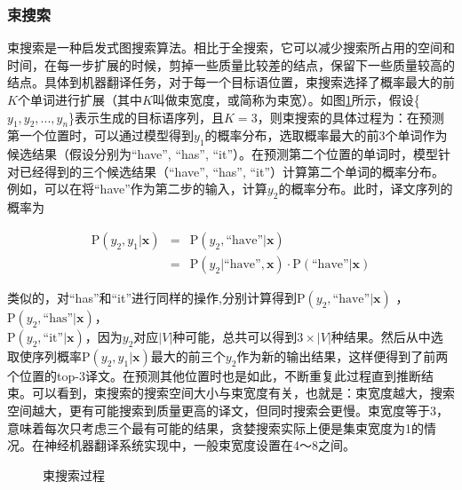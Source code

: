 \subsubsection{束搜索}
\vspace{0.5em}

\parinterval 束搜索是一种启发式图搜索算法。相比于全搜索，它可以减少搜索所占用的空间和时间，在每一步扩展的时候，剪掉一些质量比较差的结点，保留下一些质量较高的结点。具体到机器翻译任务，对于每一个目标语位置，束搜索选择了概率最大的前$K$个单词进行扩展（其中$K$叫做束宽度，或简称为束宽）。如图\ref{fig:6-34}所示，假设\{$y_1, y_2,..., y_n$\}表示生成的目标语序列，且$K=3$，则束搜索的具体过程为：在预测第一个位置时，可以通过模型得到$y_1$的概率分布，选取概率最大的前3个单词作为候选结果（假设分别为``have'', ``has'', ``it''）。在预测第二个位置的单词时，模型针对已经得到的三个候选结果（``have'', ``has'', ``it''）计算第二个单词的概率分布。例如，可以在将``have''作为第二步的输入，计算$y_2$的概率分布。此时，译文序列的概率为

\begin{eqnarray}
\textrm{P} (y_2,y_1 | \mathbf{x}) & = & \textrm{P} (y_2, \textrm{``have''} | \mathbf{x}) \nonumber \\
								  & = & \textrm{P}(y_2 | \textrm{``have''} , \mathbf{x}) \cdot \textrm{P} (\textrm{``have''} | \mathbf{x})								
\label{eq:6-38}
\end{eqnarray}

\noindent 类似的，对``has''和``it''进行同样的操作,分别计算得到$ \textrm{P} (y_2, \textrm{``have''} | \mathbf{x})$ ，$ \textrm{P} (y_2, \textrm{``has''} | \mathbf{x})$，\\ $ \textrm{P} (y_2, \textrm{``it''} | \mathbf{x})$，因为$y_2$对应$|V|$种可能，总共可以得到$3 \times |V|$种结果。然后从中选取使序列概率$\textrm{P}(y_2,y_1| \mathbf{x})$最大的前三个$y_2$作为新的输出结果，这样便得到了前两个位置的top-3译文。在预测其他位置时也是如此，不断重复此过程直到推断结束。可以看到，束搜索的搜索空间大小与束宽度有关，也就是：束宽度越大，搜索空间越大，更有可能搜索到质量更高的译文，但同时搜索会更慢。束宽度等于3，意味着每次只考虑三个最有可能的结果，贪婪搜索实际上便是集束宽度为1的情况。在神经机器翻译系统实现中，一般束宽度设置在4～8之间。

\begin{figure}[htp]
\centering

\caption{束搜索过程}
\label{fig:6-34}
\end{figure}

